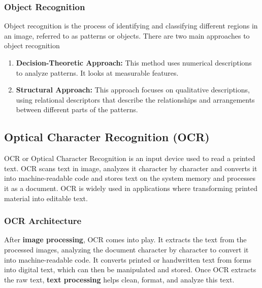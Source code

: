 \documentclass[12pt,oneside,openright,a4paper]{cpe-english-project}
\begin{document}
\subsubsection{Object Recognition} Object recognition is the process of identifying and classifying different regions in an image, referred to as patterns or objects. There are two main approaches to object recognition

\begin{enumerate}
	\item \textbf{Decision-Theoretic Approach:} This method uses numerical descriptions to analyze patterns. It looks at measurable features.
	\item \textbf{Structural Approach:} This approach focuses on qualitative descriptions, using relational descriptors that describe the relationships and arrangements between different parts of the patterns.
\end{enumerate}
 
\subsection{Optical Character Recognition (OCR)} OCR or Optical Character Recognition is an input device used to read a printed text. OCR scans text in image, analyzes it character by character and converts it into machine-readable code and stores text on the system memory and processes it as a document. OCR is widely used in applications where transforming printed material into editable text.

\subsubsection{OCR Architecture} After \textbf{image processing}, OCR comes into play. It extracts the text from the processed images, analyzing the document character by character to convert it into machine-readable code. It converts printed or handwritten text from forms into digital text, which can then be manipulated and stored. Once OCR extracts the raw text, \textbf{text processing} helps clean, format, and analyze this text.
\end{document}
